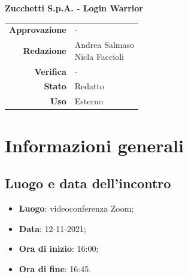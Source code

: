 \documentclass[11pt]{article}
\begin{document}
\begin{titlepage}
\begin{center}
			\large
			\textbf{Zucchetti S.p.A. - Login Warrior}\\
			
			
			
			
			\vfill
			
			
			\begin{tabular}{r|l}
				\textbf{Approvazione} &  -\\
				\textbf{Redazione} &  \parbox[t]{5cm}{Andrea Salmaso \\Nicla Faccioli}\\
				\textbf{Verifica} &  -\\
				\textbf{Stato} & Redatto \\
				\textbf{Uso} & Esterno
			\end{tabular}
			\vfill
			
		\end{center}
	\end{titlepage}

	\section{Informazioni generali}
	\subsection{Luogo e data dell'incontro}
	\begin{itemize}
		\item \textbf{Luogo}: videoconferenza Zoom;
		\item \textbf{Data}: 12-11-2021;
		\item \textbf{Ora di inizio}: 16:00;
		\item \textbf{Ora di fine}: 16:45.
	\end{itemize}
	
\end{document}
